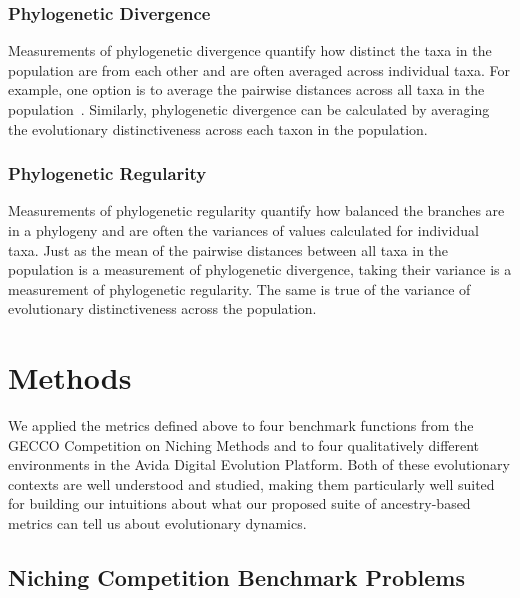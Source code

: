 \documentclass[letterpaper]{article}
\begin{document}
\subsubsection{Phylogenetic Divergence}

Measurements of phylogenetic divergence quantify how distinct the taxa in the population are from each other and are often %
averaged across
individual taxa. For example, one option is to 
average the pairwise distances across
all taxa in the population~\citep{webb_exploring_2000}. Similarly, phylogenetic divergence can be calculated by 
averaging the evolutionary distinctiveness across each taxon in the population.

\subsubsection{Phylogenetic Regularity}

Measurements of phylogenetic regularity quantify how balanced the branches are in a phylogeny and are often the variances of values calculated for individual taxa. Just as the mean of the pairwise distances between all taxa in the population is a measurement of phylogenetic divergence, taking their variance is a measurement of phylogenetic regularity. The same is true of the variance of evolutionary distinctiveness across the population.

\section{Methods}

We applied the metrics defined above to four benchmark functions from the GECCO Competition on Niching Methods \citep{li_benchmark_2013} and to four qualitatively different environments in the Avida Digital Evolution Platform.
Both of these evolutionary contexts are well understood and studied, making them particularly well suited for building our intuitions about what our proposed suite of ancestry-based metrics can tell us about evolutionary dynamics.

\subsection{Niching Competition Benchmark Problems}
\end{document}
